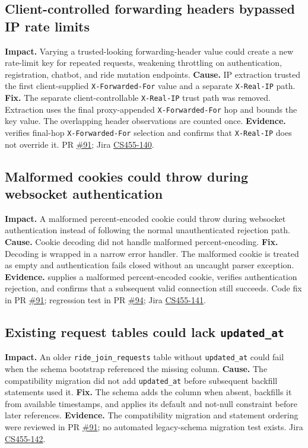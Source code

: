 \documentclass[10pt]{article}
\begin{document}
\subsection{Client-controlled forwarding headers bypassed IP rate limits}
\textbf{Impact.} Varying a trusted-looking forwarding-header value could create a new rate-limit key for repeated requests, weakening throttling on authentication, registration, chatbot, and ride mutation endpoints.
\textbf{Cause.} IP extraction trusted the first client-supplied \texttt{X-Forwarded-For} value and a separate \texttt{X-Real-IP} path.
\textbf{Fix.} The separate client-controllable \texttt{X-Real-IP} trust path was removed. Extraction uses the final proxy-appended \texttt{X-Forwarded-For} hop and bounds the key value. The overlapping header observations are counted once.
\textbf{Evidence.}  verifies final-hop \texttt{X-Forwarded-For} selection and confirms that \texttt{X-Real-IP} does not override it. PR \href{https://github.com/CS455-Carpooling/Campus_Ridepooling_Automation/pull/91}{\#91}; Jira \href{https://cs455project.atlassian.net/browse/CS455-140}{CS455-140}.
\subsection{Malformed cookies could throw during websocket authentication}
\textbf{Impact.} A malformed percent-encoded cookie could throw during websocket authentication instead of following the normal unauthenticated rejection path.
\textbf{Cause.} Cookie decoding did not handle malformed percent-encoding.
\textbf{Fix.} Decoding is wrapped in a narrow error handler. The malformed cookie is treated as empty and authentication fails closed without an uncaught parser exception.
\textbf{Evidence.}  supplies a malformed percent-encoded cookie, verifies authentication rejection, and confirms that a subsequent valid connection still succeeds. Code fix in PR \href{https://github.com/CS455-Carpooling/Campus_Ridepooling_Automation/pull/91}{\#91}; regression test in PR \href{https://github.com/CS455-Carpooling/Campus_Ridepooling_Automation/pull/94}{\#94}; Jira \href{https://cs455project.atlassian.net/browse/CS455-141}{CS455-141}.
\subsection{Existing request tables could lack \texttt{updated\_at}}
\textbf{Impact.} An older \texttt{ride\_join\_requests} table without \texttt{updated\_at} could fail when the schema bootstrap referenced the missing column.
\textbf{Cause.} The compatibility migration did not add \texttt{updated\_at} before subsequent backfill statements used it.
\textbf{Fix.} The schema adds the column when absent, backfills it from available timestamps, and applies its default and not-null constraint before later references.
\textbf{Evidence.} The compatibility migration and statement ordering were reviewed in PR \href{https://github.com/CS455-Carpooling/Campus_Ridepooling_Automation/pull/91}{\#91}; no automated legacy-schema migration test exists. Jira \href{https://cs455project.atlassian.net/browse/CS455-142}{CS455-142}.
\end{document}
